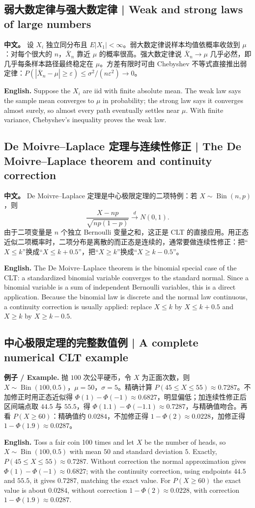 \documentclass[UTF8,11pt,a4paper]{ctexart}
\newcommand{\EN}[1]{\par\noindent\textbf{English.} #1\par}
\newcommand{\EX}[2]{\par\noindent\textbf{例子 / Example.} #1\par\EN{#2}}
\newcommand{\APS}[2]{\par\noindent\textbf{中文。} #1\par\noindent\textbf{English.} #2\par\smallskip}
\begin{document}
\subsection{弱大数定律与强大数定律 | Weak and strong laws of large numbers}
\APS{设 $X_i$ 独立同分布且 $E|X_1|<\infty$。弱大数定律说样本均值依概率收敛到 $\mu$：对每个很大的 $n$，$\bar X_n$ 靠近 $\mu$ 的概率很高。强大数定律说 $\bar X_n\to\mu$ 几乎必然，即几乎每条样本路径最终稳定在 $\mu$。方差有限时可由 Chebyshev 不等式直接推出弱定律：$P(|\bar X_n-\mu|\ge\varepsilon)\le\sigma^2/(n\varepsilon^2)\to0$。}{Suppose the $X_i$ are iid with finite absolute mean. The weak law says the sample mean converges to $\mu$ in probability; the strong law says it converges almost surely, so almost every path eventually settles near $\mu$. With finite variance, Chebyshev's inequality proves the weak law.}

\subsection{De Moivre--Laplace 定理与连续性修正 | The De Moivre--Laplace theorem and continuity correction}
\APS{De Moivre--Laplace 定理是中心极限定理的二项特例：若 $X\sim\operatorname{Bin}(n,p)$，则
\[
\frac{X-np}{\sqrt{np(1-p)}}\xrightarrow{d}N(0,1).
\]
由于二项变量是 $n$ 个独立 Bernoulli 变量之和，这正是 CLT 的直接应用。用正态近似二项概率时，二项分布是离散的而正态是连续的，通常要做连续性修正：把“$X\le k$”换成“$X\le k+0.5$”，把“$X\ge k$”换成“$X\ge k-0.5$”。}{The De Moivre--Laplace theorem is the binomial special case of the CLT: a standardized binomial variable converges to the standard normal. Since a binomial variable is a sum of independent Bernoulli variables, this is a direct application. Because the binomial law is discrete and the normal law continuous, a continuity correction is usually applied: replace $X\le k$ by $X\le k+0.5$ and $X\ge k$ by $X\ge k-0.5$.}

\subsection{中心极限定理的完整数值例 | A complete numerical CLT example}

\EX{抛 $100$ 次公平硬币，令 $X$ 为正面次数，则 $X\sim\operatorname{Bin}(100,0.5)$，$\mu=50$，$\sigma=5$。精确计算 $P(45\le X\le55)\approx0.7287$。不加修正时用正态近似得 $\Phi(1)-\Phi(-1)\approx0.6827$，明显偏低；加连续性修正后区间端点取 $44.5$ 与 $55.5$，得 $\Phi(1.1)-\Phi(-1.1)\approx0.7287$，与精确值吻合。再看 $P(X\ge60)$：精确值约 $0.0284$，不加修正得 $1-\Phi(2)\approx0.0228$，加修正得 $1-\Phi(1.9)\approx0.0287$。}{Toss a fair coin 100 times and let $X$ be the number of heads, so $X\sim\operatorname{Bin}(100,0.5)$ with mean $50$ and standard deviation $5$. Exactly, $P(45\le X\le55)\approx0.7287$. Without correction the normal approximation gives $\Phi(1)-\Phi(-1)\approx0.6827$; with the continuity correction, using endpoints $44.5$ and $55.5$, it gives $0.7287$, matching the exact value. For $P(X\ge60)$ the exact value is about $0.0284$, without correction $1-\Phi(2)\approx0.0228$, with correction $1-\Phi(1.9)\approx0.0287$.}
\end{document}

